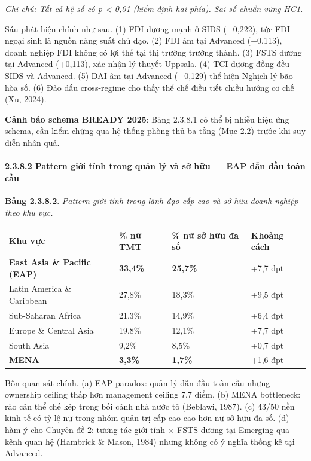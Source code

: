 \documentclass[12pt,a4paper]{article}
\begin{document}
\emph{Ghi chú: Tất cả hệ số có p \textless{} 0,01 (kiểm định hai phía).
Sai số chuẩn vững HC1.}

Sáu phát hiện chính như sau. (1) FDI dương mạnh ở SIDS (+0,222), tức FDI
ngoại sinh là nguồn năng suất chủ đạo. (2) FDI âm tại Advanced (−0,113),
doanh nghiệp FDI không có lợi thế tại thị trường trưởng thành. (3) FSTS
dương tại Advanced (+0,113), xác nhận lý thuyết Uppsala. (4) TCI dương
đồng đều SIDS và Advanced. (5) DAI âm tại Advanced (−0,129) thể hiện
Nghịch lý bão hòa số. (6) Đảo dấu cross-regime cho thấy thể chế điều
tiết chiều hướng cơ chế (Xu, 2024).

\textbf{Cảnh báo schema BREADY 2025}: Bảng 2.3.8.1 có thể bị nhiễu hiệu
ứng schema, cần kiểm chứng qua hệ thống phòng thủ ba tầng (Mục 2.2)
trước khi suy diễn nhân quả.

\hypertarget{2382-pattern-giux1edbi-tuxednh-trong-quux1ea3n-luxfd-vuxe0-sux1edf-hux1eefu--eap-dux1eabn-ux111ux1ea7u-touxe0n-cux1ea7u}{%
\paragraph{2.3.8.2 Pattern giới tính trong quản lý và sở hữu --- EAP dẫn
đầu toàn
cầu}\label{2382-pattern-giux1edbi-tuxednh-trong-quux1ea3n-luxfd-vuxe0-sux1edf-hux1eefu--eap-dux1eabn-ux111ux1ea7u-touxe0n-cux1ea7u}}

\textbf{Bảng 2.3.8.2}. \emph{Pattern giới tính trong lãnh đạo cấp cao và
sở hữu doanh nghiệp theo khu vực.}

\begin{longtable}[]{@{}llll@{}}
\toprule\noalign{}
Khu vực & \% nữ TMT & \% nữ sở hữu đa số & Khoảng cách \\
\midrule\noalign{}
\endhead
\bottomrule\noalign{}
\endlastfoot
\textbf{East Asia \& Pacific (EAP)} & \textbf{33,4\%} & \textbf{25,7\%}
& +7,7 đpt \\
Latin America \& Caribbean & 27,8\% & 18,3\% & +9,5 đpt \\
Sub-Saharan Africa & 21,3\% & 14,9\% & +6,4 đpt \\
Europe \& Central Asia & 19,8\% & 12,1\% & +7,7 đpt \\
South Asia & 9,2\% & 8,5\% & +0,7 đpt \\
\textbf{MENA} & \textbf{3,3\%} & \textbf{1,7\%} & +1,6 đpt \\
\end{longtable}

Bốn quan sát chính. (a) EAP paradox: quản lý dẫn đầu toàn cầu nhưng
ownership ceiling thấp hơn management ceiling 7,7 điểm. (b) MENA
bottleneck: rào cản thể chế kép trong bối cảnh nhà nước tô (Beblawi,
1987). (c) 43/50 nền kinh tế có tỷ lệ nữ trong nhóm quản trị cấp cao cao
hơn nữ sở hữu đa số. (d) hàm ý cho Chuyên đề 2: tương tác giới tính ×
FSTS dương tại Emerging qua kênh quan hệ (Hambrick \& Mason, 1984) nhưng
không có ý nghĩa thống kê tại Advanced.
\end{document}
